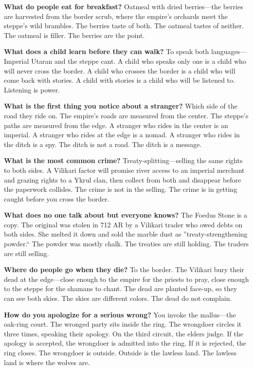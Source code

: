 \vspace{1em}

\begin{almanac}
\textbf{What do people eat for breakfast?} Oatmeal with dried berries---the berries are harvested from the border scrub, where the empire's orchards meet the steppe's wild brambles. The berries taste of both. The oatmeal tastes of neither. The oatmeal is filler. The berries are the point.

\textbf{What does a child learn before they can walk?} To speak both languages---Imperial Utaran and the steppe cant. A child who speaks only one is a child who will never cross the border. A child who crosses the border is a child who will come back with stories. A child with stories is a child who will be listened to. Listening is power.

\textbf{What is the first thing you notice about a stranger?} Which side of the road they ride on. The empire's roads are measured from the center. The steppe's paths are measured from the edge. A stranger who rides in the center is an imperial. A stranger who rides at the edge is a nomad. A stranger who rides in the ditch is a spy. The ditch is not a road. The ditch is a message.

\textbf{What is the most common crime?} Treaty-splitting---selling the same rights to both sides. A Vilikari factor will promise river access to an imperial merchant and grazing rights to a Ykrul clan, then collect from both and disappear before the paperwork collides. The crime is not in the selling. The crime is in getting caught before you cross the border.

\textbf{What does no one talk about but everyone knows?} The Foedus Stone is a copy. The original was stolen in 712 AR by a Vilikari trader who owed debts on both sides. She melted it down and sold the marble dust as ''treaty-strengthening powder.`` The powder was mostly chalk. The treaties are still holding. The traders are still selling.

\textbf{Where do people go when they die?} To the border. The Vilikari bury their dead at the edge---close enough to the empire for the priests to pray, close enough to the steppe for the shamans to chant. The dead are planted face-up, so they can see both skies. The skies are different colors. The dead do not complain.

\textbf{How do you apologize for a serious wrong?} You invoke the mallus---the oak-ring court. The wronged party sits inside the ring. The wrongdoer circles it three times, speaking their apology. On the third circuit, the elders judge. If the apology is accepted, the wrongdoer is admitted into the ring. If it is rejected, the ring closes. The wrongdoer is outside. Outside is the lawless land. The lawless land is where the wolves are.


\end{almanac}
